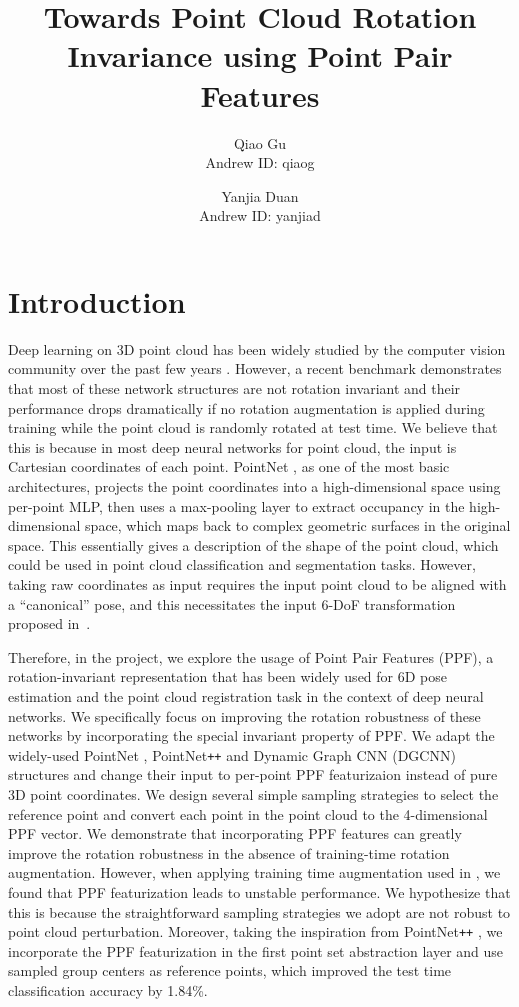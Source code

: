\documentclass{article}
\title{Towards Point Cloud Rotation Invariance using Point Pair Features}
\author{Qiao Gu \\
  Andrew ID: qiaog
  \and
  Yanjia Duan \\
  Andrew ID: yanjiad
  }
\date{}
\begin{document}
\maketitle

\section{Introduction}

Deep learning on 3D point cloud has been widely studied by the computer vision community over the past few years \cite{Qi2017pointnet, qi2017pointnet2, Wang2019-dgcnn, Li2018-PointCNN}. 
However, a recent benchmark \cite{taghanaki2020robustpointset} demonstrates that most of these network structures are not rotation invariant and their performance drops dramatically if no rotation augmentation is applied during training while the point cloud is randomly rotated at test time. 
We believe that this is because in most deep neural networks for point cloud, the input is Cartesian coordinates of each point. PointNet \cite{Qi2017pointnet}, as one of the most basic architectures, projects the point coordinates into a high-dimensional space using per-point MLP, then uses a max-pooling layer to extract occupancy in the high-dimensional space, which maps back to complex geometric surfaces in the original space. This essentially gives a description of the shape of the point cloud, which could be used in point cloud classification and segmentation tasks.
However, taking raw coordinates as input requires the input point cloud to be aligned with a ``canonical'' pose, and this necessitates the input 6-DoF transformation proposed in~\cite{Qi2017pointnet}. 

Therefore, in the project, we explore the usage of Point Pair Features (PPF), a rotation-invariant representation that has been widely used for 6D pose estimation and the point cloud registration task in the context of deep neural networks. We specifically focus on improving the rotation robustness of these networks by incorporating the special invariant property of PPF. 
We adapt the widely-used PointNet \cite{Qi2017pointnet}, PointNet\texttt{++} \cite{qi2017pointnet2} and Dynamic Graph CNN (DGCNN) \cite{Wang2019-dgcnn} structures and change their input to per-point PPF featurizaion instead of pure 3D point coordinates. 
We design several simple sampling strategies to select the reference point and convert each point in the point cloud to the 4-dimensional PPF vector. We demonstrate that incorporating PPF features can greatly improve the rotation robustness in the absence of training-time rotation augmentation. 
However, when applying training time augmentation used in \cite{qi2017pointnet2}, we found that PPF featurization leads to unstable performance. We hypothesize that this is because the straightforward sampling strategies we adopt are not robust to point cloud perturbation.
Moreover, taking the inspiration from PointNet\texttt{++} \cite{qi2017pointnet2}, we incorporate the PPF featurization in the first point set abstraction layer and use sampled group centers as reference points, which improved the test time classification accuracy by 1.84\%.
\end{document}
